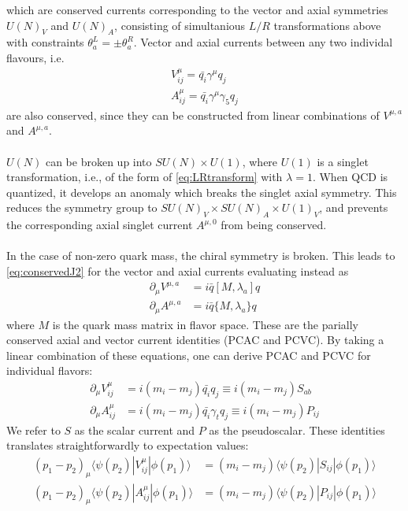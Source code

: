 which are conserved currents corresponding to the vector and axial symmetries $U(N)_V$ and $U(N)_A$, consisting of simultanious $L/R$ transformations above with constraints $\theta_a^{L} = \pm \theta_a^{R}$. Vector and axial currents between any two individal flavours, i.e.
\begin{align}
	\label{eq:individualflavs1}
	V^{\mu}_{ij} = \bar{q_i} \gamma^{\mu} q_j \\
	A^{\mu}_{ij} = \bar{q_i} \gamma^{\mu} \gamma_5 q_j
	\label{eq:individualflavs2}
\end{align}
are also conserved, since they can be constructed from linear combinations of $V^{\mu,a}$ and $A^{\mu,a}$.
\\ \\
$U(N)$ can be broken up into $SU(N)\times U(1)$, where $U(1)$ is a singlet transformation, i.e., of the form of \eqref{eq:LRtransform} with $\lambda = 1$. When QCD is quantized, it develops an anomaly which breaks the singlet axial symmetry. This reduces the symmetry group to $SU(N)_V\times SU(N)_A\times U(1)_V$, and prevents the corresponding axial singlet current $A^{\mu,0}$ from being conserved.
\\ \\
In the case of non-zero quark mass, the chiral symmetry is broken. This leads to \eqref{eq:conservedJ2} for the vector and axial currents evaluating instead as
\begin{align}
	\partial_{\mu} V^{\mu,a} &= i\bar{q} [ M,  \lambda_a ] q \\
	\partial_{\mu} A^{\mu,a} &= i\bar{q} \{ M, \lambda_a \} q 
\end{align}
where $M$ is the quark mass matrix in flavor space. These are the parially conserved axial and vector current identities (PCAC and PCVC). By taking a linear combination of these equations, one can derive PCAC and PCVC for individual flavors:
\begin{align}
	\partial_{\mu} V_{ij}^{\mu} &= i(m_i - m_j) \bar{q_i} q_j \equiv i(m_i - m_j) S_{ab} \\
	\partial_{\mu} A_{ij}^{\mu} &= i(m_i - m_j) \bar{q_i} \gamma_t q_j \equiv i(m_i - m_j) P_{ij}
\end{align}
We refer to $S$ as the scalar current and $P$ as the pseudoscalar. These identities translates straightforwardly to expectation values:
\begin{align}
	\label{eq:PCVC}
	(p_1 - p_2)_{\mu} \langle \psi(p_2) | V^{\mu}_{ij} | \phi(p_1) \rangle &= (m_i - m_j) \langle \psi(p_2) | S_{ij} | \phi(p_1) \rangle \\
	(p_1 - p_2)_{\mu} \langle \psi(p_2) | A^{\mu}_{ij} | \phi(p_1) \rangle &= (m_i - m_j) \langle \psi(p_2) | P_{ij} | \phi(p_1) \rangle
\end{align}
